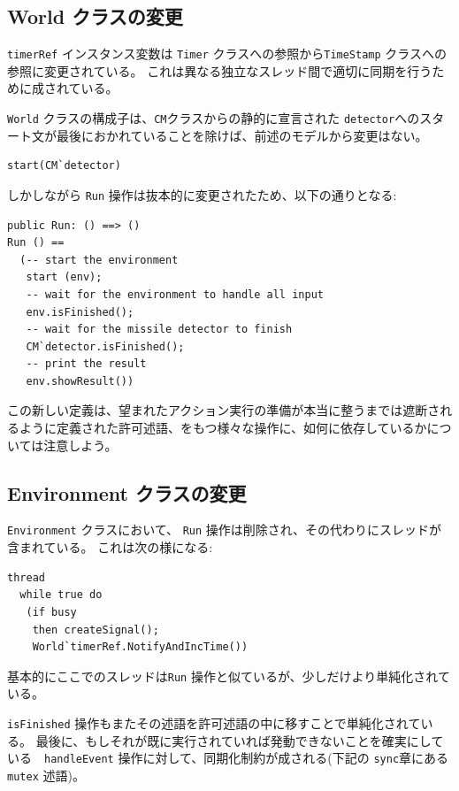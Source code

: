 \documentclass[\pformat,12pt]{jreport}
\begin{document}
\subsection{World クラスの変更}

\texttt{timerRef} インスタンス変数は \texttt{Timer} クラスへの参照から\texttt{TimeStamp} クラスへの参照に変更されている。
これは異なる独立なスレッド間で適切に同期を行うために成されている。

 \texttt{World} クラスの構成子は、\texttt{CM}クラスからの静的に宣言された \texttt{detector}へのスタート文が最後におかれていることを除けば、前述のモデルから変更はない。

\begin{lstlisting}
start(CM`detector)
\end{lstlisting}

しかしながら \texttt{Run} 操作は抜本的に変更されたため、以下の通りとなる:

\begin{lstlisting}
public Run: () ==> ()
Run () == 
  (-- start the environment
   start (env);
   -- wait for the environment to handle all input
   env.isFinished();
   -- wait for the missile detector to finish
   CM`detector.isFinished();
   -- print the result
   env.showResult())
\end{lstlisting}

この新しい定義は、望まれたアクション実行の準備が本当に整うまでは遮断されるように定義された許可述語、をもつ様々な操作に、如何に依存しているかについては注意しよう。

\subsection{Environment クラスの変更}

 \texttt{Environment} クラスにおいて、 \texttt{Run} 操作は削除され、その代わりにスレッドが含まれている。
これは次の様になる:

\begin{lstlisting}
thread
  while true do
   (if busy
    then createSignal();
    World`timerRef.NotifyAndIncTime())
\end{lstlisting}

基本的にここでのスレッドは\texttt{Run} 操作と似ているが、少しだけより単純化されている。

 \texttt{isFinished} 操作もまたその述語を許可述語の中に移すことで単純化されている。
最後に、もしそれが既に実行されていれば発動できないことを確実にしている　\texttt{handleEvent} 操作に対して、同期化制約が成される(下記の \texttt{sync}章にある \texttt{mutex} 述語)。
\end{document}
